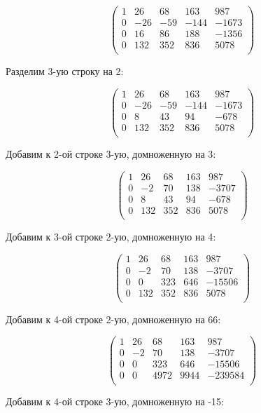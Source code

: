 	\[
	\begin{pmatrix}
	1 & 26 & 68 & 163 & 987 \\
	0 & -26 & -59 & -144 & -1673 \\
	0 & 16 & 86 & 188 & -1356 \\
	0 & 132 & 352 & 836 & 5078 \\
	\end{pmatrix}
	\]
	
	Разделим 3-ую строку на 2:
	
	\[
	\begin{pmatrix}
	1 & 26 & 68 & 163 & 987 \\
	0 & -26 & -59 & -144 & -1673 \\
	0 & 8 & 43 & 94 & -678 \\
	0 & 132 & 352 & 836 & 5078 \\
	\end{pmatrix}
	\]
	
	Добавим к 2-ой строке 3-ую, домноженную на 3:
	
	\[
	\begin{pmatrix}
	1 & 26 & 68 & 163 & 987 \\
	0 & -2 & 70 & 138 & -3707 \\
	0 & 8 & 43 & 94 & -678 \\
	0 & 132 & 352 & 836 & 5078 \\
	\end{pmatrix}
	\]
	
	Добавим к 3-ой строке 2-ую, домноженную на 4:
	
	\[
	\begin{pmatrix}
	1 & 26 & 68 & 163 & 987 \\
	0 & -2 & 70 & 138 & -3707 \\
	0 & 0 & 323 & 646 & -15506 \\
	0 & 132 & 352 & 836 & 5078 \\
	\end{pmatrix}
	\]
	
	Добавим к 4-ой строке 2-ую, домноженную на 66:
	
	\[
	\begin{pmatrix}
	1 & 26 & 68 & 163 & 987 \\
	0 & -2 & 70 & 138 & -3707 \\
	0 & 0 & 323 & 646 & -15506 \\
	0 & 0 & 4972 & 9944 & -239584 \\
	\end{pmatrix}
	\]
	
	Добавим к 4-ой строке 3-ую, домноженную на -15:
	
